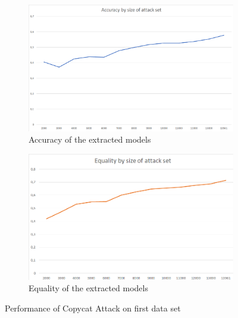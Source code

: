 \documentclass[a4paper,11pt]{article}
\begin{document}
        \begin{figure}[h!]
            \centering
            \begin{subfigure}[c]{0.49\textwidth}
                \centering
                \includegraphics[width=1\textwidth]{exercise_3/paper/images/accuracy_copy_Azure.png}
                \caption{Accuracy of the extracted models}
                \label{fig:Accuracy_Azure}
            \end{subfigure}
            \begin{subfigure}[c]{0.49\textwidth}
                \centering
                \includegraphics[width=1\textwidth]{exercise_3/paper/images/equality_copy_Azure.png}
                \caption{Equality of the extracted models}
                \label{fig:Equality_Azure}
            \end{subfigure}
            \caption{Performance of Copycat Attack on first data set}
            \label{fig:performance-azure}
        \end{figure}
        
\end{document}
